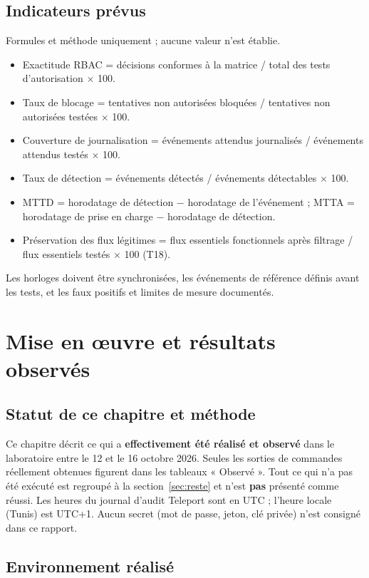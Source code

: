 \documentclass[11pt,a4paper]{report}
\begin{document}
\section{Indicateurs prévus}
Formules et méthode uniquement ; aucune valeur n'est établie.
\begin{itemize}
\item Exactitude RBAC = décisions conformes à la matrice / total des tests d'autorisation $\times$ 100.
\item Taux de blocage = tentatives non autorisées bloquées / tentatives non autorisées testées $\times$ 100.
\item Couverture de journalisation = événements attendus journalisés / événements attendus testés $\times$ 100.
\item Taux de détection = événements détectés / événements détectables $\times$ 100.
\item MTTD = horodatage de détection $-$ horodatage de l'événement ; MTTA = horodatage de prise en charge $-$ horodatage de détection.
\item Préservation des flux légitimes = flux essentiels fonctionnels après filtrage / flux essentiels testés $\times$ 100 (T18).
\end{itemize}
Les horloges doivent être synchronisées, les événements de référence définis avant les tests, et les faux positifs et limites de mesure documentés.

\chapter{Mise en œuvre et résultats observés}\label{chap:real}

\section{Statut de ce chapitre et méthode}
Ce chapitre décrit ce qui a \textbf{effectivement été réalisé et observé} dans le laboratoire entre le 12 et le 16 octobre 2026. Seules les sorties de commandes réellement obtenues figurent dans les tableaux « Observé ». Tout ce qui n'a pas été exécuté est regroupé à la section~\ref{sec:reste} et n'est \textbf{pas} présenté comme réussi. Les heures du journal d'audit Teleport sont en UTC ; l'heure locale (Tunis) est UTC+1. Aucun secret (mot de passe, jeton, clé privée) n'est consigné dans ce rapport.

\section{Environnement réalisé}
\end{document}
